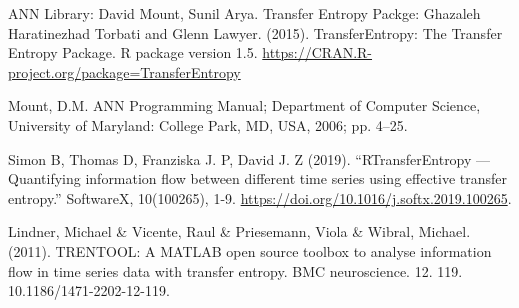 \documentclass[conference]{IEEEtran}
\begin{document}
\begin{thebibliography}{00}
 ANN Library: David Mount, Sunil Arya. Transfer Entropy Packge:  Ghazaleh Haratinezhad Torbati and Glenn Lawyer. (2015).  TransferEntropy: The Transfer Entropy Package. R package version 1.5.  \url{https://CRAN.R-project.org/package=TransferEntropy}

 Mount, D.M. ANN Programming Manual; Department of Computer Science, University of Maryland: College Park, MD, USA, 2006; pp. 4–25.

 Simon B, Thomas D, Franziska J. P, David J. Z (2019). “RTransferEntropy — Quantifying information flow between different time series using effective transfer entropy.” SoftwareX, 10(100265), 1-9. \url{https://doi.org/10.1016/j.softx.2019.100265}.

 Lindner, Michael \& Vicente, Raul \& Priesemann, Viola \& Wibral, Michael. (2011). TRENTOOL: A MATLAB open source toolbox to analyse information flow in time series data with transfer entropy. BMC neuroscience. 12. 119. 10.1186/1471-2202-12-119.

\end{thebibliography}
\end{document}
